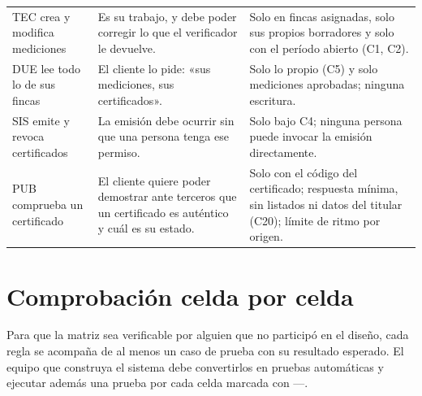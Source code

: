 \documentclass[11pt,letterpaper]{article}
\begin{document}
{\begin{longtable}{@{}L{3.9cm} L{6.3cm} L{5.4cm}@{}}
TEC crea y modifica mediciones &
Es su trabajo, y debe poder corregir lo que el verificador le devuelve. &
Solo en fincas asignadas, solo sus propios borradores y solo con el período abierto (C1, C2). \\
DUE lee todo lo de sus fincas &
El cliente lo pide: «sus mediciones, sus certificados». &
Solo lo propio (C5) y solo mediciones aprobadas; ninguna escritura. \\
SIS emite y revoca certificados &
La emisión debe ocurrir sin que una persona tenga ese permiso. &
Solo bajo C4; ninguna persona puede invocar la emisión directamente. \\
PUB comprueba un certificado &
El cliente quiere poder demostrar ante terceros que un certificado es auténtico y cuál es su estado. &
Solo con el código del certificado; respuesta mínima, sin listados ni datos del titular (C20); límite de ritmo por origen. \\
\end{longtable}
}

\section{Comprobación celda por celda}
\label{sec:casos}

Para que la matriz sea verificable por alguien que no participó en el diseño, cada regla se acompaña
de al menos un caso de prueba con su resultado esperado. El equipo que construya el sistema debe
convertirlos en pruebas automáticas y ejecutar además una prueba por cada celda marcada con
---.
\end{document}
